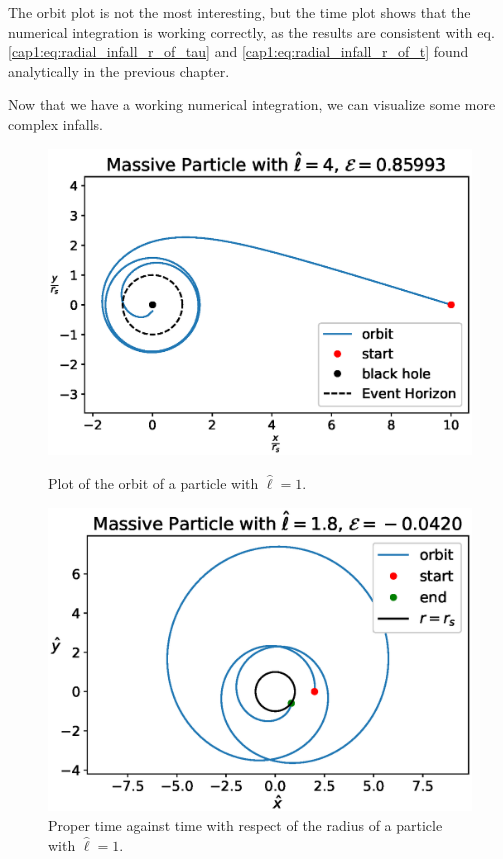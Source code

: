 The orbit plot is not the most interesting, but the time plot shows that the
numerical integration is working correctly, as the results are consistent with
eq. \ref{cap1:eq:radial_infall_r_of_tau} and \ref{cap1:eq:radial_infall_r_of_t}
found analytically in the previous chapter.

Now that we have a working numerical integration, we can visualize some more
complex infalls.

\begin{figure}[h]
    \begin{minipage}{0.48\textwidth}
        \centering
        \includegraphics[width=\textwidth]{Figures/chapter2/infall1.eps}
        \caption{Plot of the orbit of a particle with $\hat \ell = 1$.}
    \end{minipage}
    \hspace{0.015 \textwidth}
    \begin{minipage}{0.48\textwidth}
        \centering
        \includegraphics[width=\textwidth]{Figures/chapter2/infall2.eps}
        \caption{Proper time against \Sh time with respect of the radius of a
        particle with $\hat \ell = 1$.}
    \end{minipage}
\end{figure}




